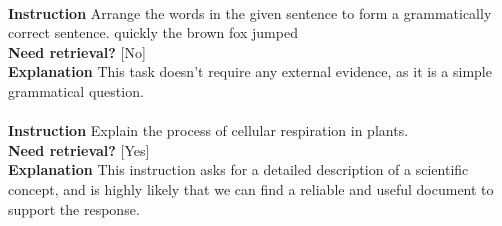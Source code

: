 \begin{table}[h!]
\begin{tcolorbox}
\\
{\bf Instruction} Arrange the words in the given sentence to form a grammatically correct sentence. quickly the brown fox jumped\\
{\bf Need retrieval?} [No]\\
{\bf Explanation}  This task doesn't require any external evidence, as it is a simple grammatical question. 
\\
\\
{\bf Instruction} Explain the process of cellular respiration in plants.\\
{\bf Need retrieval?} [Yes]\\
{\bf Explanation} This instruction asks for a detailed description of a scientific concept, and is highly likely that we can find a reliable and useful document to support the response. 
\end{tcolorbox}
\caption{\label{tab:algo_box} Instructions and demonstrations for \ret~aspect given the input only. }
\end{table} 

